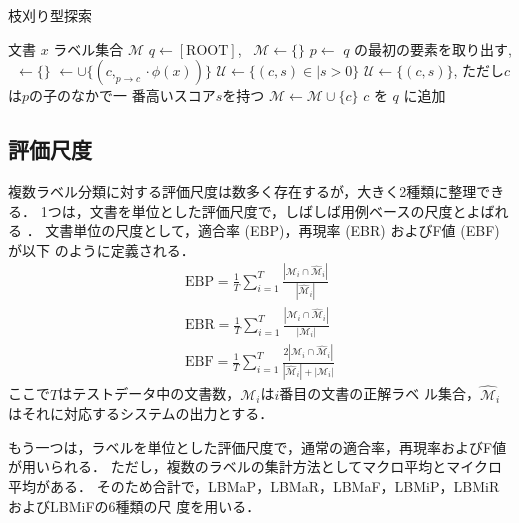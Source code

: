 \documentclass[japanese]{jnlp_1.4}
\newcommand{\vect}[1]{}
\begin{document}
\begin{algorithm}[t]
\caption{枝刈り型探索}
\label{alg:td-search}
\DeclarePairedDelimiter\norm{\lVert}{\rVert}
\renewcommand{\algorithmicrequire}{}
\renewcommand{\algorithmicensure}{}
\setlength{\baselineskip}{11pt}
\begin{algorithmic}[1]
\REQUIRE 文書 $x$
\ENSURE ラベル集合 $\mathcal{M}$
\STATE $q \leftarrow [\mathrm{ROOT}]$, \, $\mathcal{M} \leftarrow \{\}$
  \STATE $p \leftarrow$ $q$ の最初の要素を取り出す, \, $\vect{t} \leftarrow \{\}$
    \STATE $\vect{t} \leftarrow \vect{t} \cup \{(c, \vect{w}_{p \rightarrow c} \cdot \phi(x))\}$
  \ENDFOR
  \STATE $\mathcal{U} \leftarrow \{(c,s) \in \vect{t} | s > 0 \}$
    \STATE $\mathcal{U} \leftarrow \{(c,s)\}$, ただし$c$は$p$の子のなかで一
 番高いスコア$s$を持つ
  \ENDIF
      \STATE $\mathcal{M} \leftarrow \mathcal{M} \cup \{c\}$
    \ELSE
      \STATE $c$ を $q$ に追加
    \ENDIF
  \ENDFOR
\ENDWHILE
\end{algorithmic}
\end{algorithm}


\subsection{評価尺度}
\label{sec:experiments-measures}

複数ラベル分類に対する評価尺度は数多く存在するが，大きく2種類に整理でき
る．
1つは，文書を単位とした評価尺度で，しばしば用例ベースの尺度とよばれる
\cite{Godbole2004,Tsoumakas2010full}．
文書単位の尺度として，適合率 (EBP)，再現率 (EBR) およびF値 (EBF) が以下
のように定義される．
{\allowdisplaybreaks
\begin{gather*}
 \mathrm{EBP} = \frac{1}{T} \sum_{i=1}^T
  \frac{|\mathcal{M}_i \cap \hat{\mathcal{M}}_i|}{|\hat{\mathcal{M}}_i|} \\
 \mathrm{EBR} = \frac{1}{T} \sum_{i=1}^T
  \frac{|\mathcal{M}_i \cap \hat{\mathcal{M}}_i|}{|\mathcal{M}_i|} \\
 \mathrm{EBF} = \frac{1}{T} \sum_{i=1}^T
  \frac{2 |\mathcal{M}_i \cap \hat{\mathcal{M}}_i|}{|\hat{\mathcal{M}}_i| + |\mathcal{M}_i|}
\end{gather*}
}
ここで$T$はテストデータ中の文書数，$\mathcal{M}_i$は$i$番目の文書の正解ラベ
ル集合，$\hat{\mathcal{M}}_i$はそれに対応するシステムの出力とする．

もう一つは，ラベルを単位とした評価尺度で，通常の適合率，再現率およびF値
が用いられる．
ただし，複数のラベルの集計方法としてマクロ平均とマイクロ平均がある\cite{Tsoumakas2010full}．
そのため合計で，LBMaP，LBMaR，LBMaF，LBMiP，LBMiRおよびLBMiFの6種類の尺
度を用いる．
\end{document}
